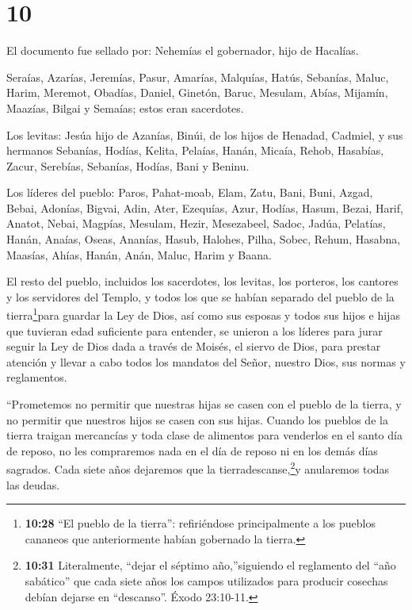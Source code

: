 \hypertarget{section-9}{%
\section{10}\label{section-9}}

 El documento fue sellado por: Nehemías el gobernador, hijo
de Hacalías.

 Seraías, Azarías, Jeremías,  Pasur, Amarías,
Malquías,  Hatús, Sebanías, Maluc,  Harim,
Meremot, Obadías,  Daniel, Ginetón, Baruc, 
Mesulam, Abías, Mijamín,  Maazías, Bilgai y Semaías; estos
eran sacerdotes.

 Los levitas: Jesúa hijo de Azanías, Binúi, de los hijos de
Henadad, Cadmiel,  y sus hermanos Sebanías, Hodías, Kelita,
Pelaías, Hanán,  Micaía, Rehob, Hasabías, 
Zacur, Serebías, Sebanías,  Hodías, Bani y Beninu.

 Los líderes del pueblo: Paros, Pahat-moab, Elam, Zatu,
Bani,  Buni, Azgad, Bebai,  Adonías, Bigvai,
Adin,  Ater, Ezequías, Azur,  Hodías, Hasum,
Bezai,  Harif, Anatot, Nebai,  Magpías,
Mesulam, Hezir,  Mesezabeel, Sadoc, Jadúa, 
Pelatías, Hanán, Anaías,  Oseas, Ananías, Hasub,
 Halohes, Pilha, Sobec,  Rehum, Hasabna,
Maasías,  Ahías, Hanán, Anán,  Maluc, Harim y
Baana.

 El resto del pueblo, incluidos los sacerdotes, los
levitas, los porteros, los cantores y los servidores del Templo, y todos
los que se habían separado del pueblo de la tierra\footnote{\textbf{10:28}
  ``El pueblo de la tierra'': refiriéndose principalmente a los pueblos
  cananeos que anteriormente habían gobernado la tierra.}para guardar la
Ley de Dios, así como sus esposas y todos sus hijos e hijas que tuvieran
edad suficiente para entender,  se unieron a los líderes
para jurar seguir la Ley de Dios dada a través de Moisés, el siervo de
Dios, para prestar atención y llevar a cabo todos los mandatos del
Señor, nuestro Dios, sus normas y reglamentos.

 ``Prometemos no permitir que nuestras hijas se casen con
el pueblo de la tierra, y no permitir que nuestros hijos se casen con
sus hijas.  Cuando los pueblos de la tierra traigan
mercancías y toda clase de alimentos para venderlos en el santo día de
reposo, no les compraremos nada en el día de reposo ni en los demás días
sagrados. Cada siete años dejaremos que la tierradescanse,\footnote{\textbf{10:31}
  Literalmente, ``dejar el séptimo año,''siguiendo el reglamento del
  ``año sabático'' que cada siete años los campos utilizados para
  producir cosechas debían dejarse en ``descanso''. Éxodo 23:10-11.}y
anularemos todas las deudas.

